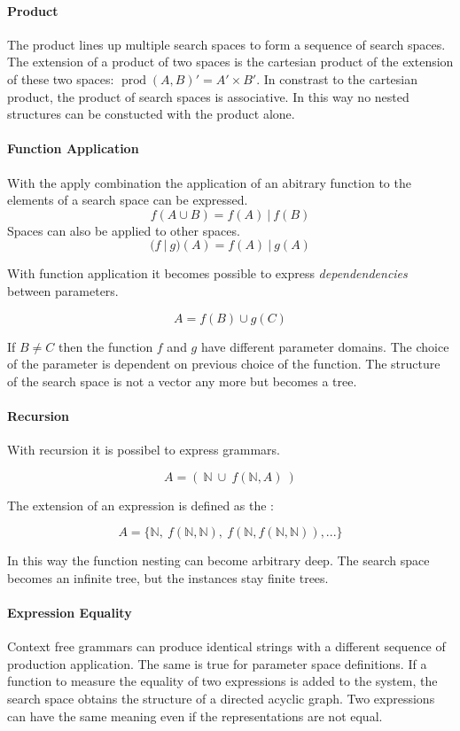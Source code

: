 \documentclass[english]{article}
\begin{document}
\paragraph{Product}
The product lines up multiple search spaces to form a sequence of search spaces. The extension of a product of two spaces is the cartesian product of the extension of these two spaces: $\operatorname{prod}(A,B)' = A' \times B'$. In constrast to the cartesian product, the product of search spaces is associative.  In this way no nested structures can be constucted with the product alone.

\paragraph{Function Application}
With the apply combination the application of an abitrary function to the elements of a search space can be expressed.
$$ f(A \cup B) = f(A)\ |\ f(B) $$
Spaces can also be applied to other spaces.
$$(f\ |\ g)(A) = f(A)\ |\ g(A)$$

With function application it becomes possible to express \textit{dependendencies} between parameters.

$$A = f(B) \cup g(C)$$

If $B \neq C$ then the function $f$ and $g$ have different parameter domains. The choice of the parameter is dependent on previous choice of the function.  The structure of the search space is not a vector any more but becomes a tree.

\paragraph{Recursion}
With recursion it is possibel to express grammars.

$$ A = (\ \mathbb{N}\ \cup\ f(\mathbb{N}, A)\ ) $$

The extension of an expression is defined as the  :

$$ A = \{\mathbb{N},\ f(\mathbb{N}, \mathbb{N}),\ f(\mathbb{N}, f(\mathbb{N}, \mathbb{N})), ... \}$$

In this way the function nesting can become arbitrary deep. The search space becomes an infinite tree, but the instances stay finite trees.

\paragraph{Expression Equality}
Context free grammars can produce identical strings with a different sequence of production application. The same is true for parameter space definitions.
If a function to measure the equality of two expressions is added to the system, the search space obtains the structure of a directed acyclic graph.
Two expressions can have the same meaning even if the representations are not equal.
\end{document}
